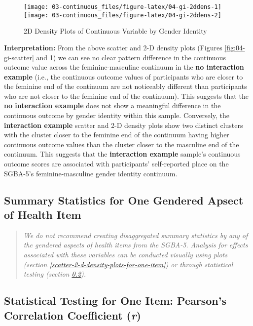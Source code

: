 \documentclass[
]{book}
\begin{document}
\begin{figure}

{\centering \texttt{[image: 03-continuous\_files/figure-latex/04-gi-2ddens-1]} \texttt{[image: 03-continuous\_files/figure-latex/04-gi-2ddens-2]} 

}

\caption{2D Density Plots of Continuous Variable by Gender Identity}\label{fig:04-gi-2ddens}
\end{figure}

\textbf{Interpretation:} From the above scatter and 2-D density plots (Figures \ref{fig:04-gi-scatter} and \ref{fig:04-gi-2ddens}) we can see no clear pattern difference in the continuous outcome value across the feminine-masculine continuum in the \textbf{no interaction example} (i.e., the continuous outcome values of participants who are closer to the feminine end of the continuum are not noticeably different than participants who are not closer to the feminine end of the continuum). This suggests that the \textbf{no interaction example} does not show a meaningful difference in the continuous outcome by gender identity within this sample. Conversely, the \textbf{interaction example} scatter and 2-D density plots show two distinct clusters with the cluster closer to the feminine end of the continuum having higher continuous outcome values than the cluster closer to the masculine end of the continuum. This suggests that the \textbf{interaction example} sample's continuous outcome scores are associated with participants' self-reported place on the SGBA-5's feminine-masculine gender identity continuum.

\subsection{Summary Statistics for One Gendered Apsect of Health Item}\label{summary-statistics-for-one-gendered-apsect-of-health-item}

\begin{quote}
\emph{We do not recommend creating disaggregated summary statistics by any of the gendered aspects of health items from the SGBA-5. Analysis for effects associated with these variables can be conducted visually using plots (section \ref{scatter-2-d-density-plots-for-one-item}) or through statistical testing (section \ref{statistical-testing-for-one-item-pearsons-correlation-coefficient-r}).}
\end{quote}

\subsection{\texorpdfstring{Statistical Testing for One Item: Pearson's Correlation Coefficient (\emph{r})}{Statistical Testing for One Item: Pearson's Correlation Coefficient (r)}}\label{statistical-testing-for-one-item-pearsons-correlation-coefficient-r}
\end{document}
